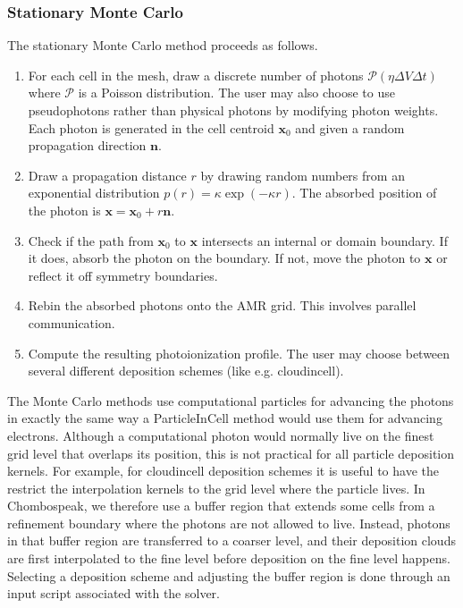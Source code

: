 \documentclass[letterpaper,10pt,english]{sphinxmanual}
\begin{document}
\subsubsection{Stationary Monte Carlo}
\label{\detokenize{Solvers/RTE:stationary-monte-carlo}}
\sphinxAtStartPar
The stationary Monte Carlo method proceeds as follows.
\begin{enumerate}
%
\item {} 
\sphinxAtStartPar
For each cell in the mesh, draw a discrete number of photons \(\mathcal{P}\left(\eta \Delta V\Delta t\right)\) where \(\mathcal{P}\) is a Poisson distribution. The user may also choose to use pseudophotons rather than physical photons by modifying photon weights. Each photon is generated in the cell centroid \(\mathbf{x}_0\) and given a random propagation direction \(\mathbf{n}\).

\item {} 
\sphinxAtStartPar
Draw a propagation distance \(r\) by drawing random numbers from an exponential distribution \(p(r) = \kappa \exp\left(-\kappa r\right)\). The absorbed position of the photon is \(\mathbf{x} = \mathbf{x}_0 + r\mathbf{n}\).

\item {} 
\sphinxAtStartPar
Check if the path from \(\mathbf{x}_0\) to \(\mathbf{x}\) intersects an internal or domain boundary. If it does, absorb the photon on the boundary. If not, move the photon to \(\mathbf{x}\) or reflect it off symmetry boundaries.

\item {} 
\sphinxAtStartPar
Rebin the absorbed photons onto the AMR grid. This involves parallel communication.

\item {} 
\sphinxAtStartPar
Compute the resulting photoionization profile. The user may choose between several different deposition schemes (like e.g. cloud\sphinxhyphen{}in\sphinxhyphen{}cell).

\end{enumerate}

\sphinxAtStartPar
The Monte Carlo methods use computational particles for advancing the photons in exactly the same way a Particle\sphinxhyphen{}In\sphinxhyphen{}Cell method would use them for advancing electrons. Although a computational photon would normally live on the finest grid level that overlaps its position, this is not practical for all particle deposition kernels. For example, for cloud\sphinxhyphen{}in\sphinxhyphen{}cell deposition schemes it is useful to have the restrict the interpolation kernels to the grid level where the particle lives. In Chombo\sphinxhyphen{}speak, we therefore use a buffer region that extends some cells from a refinement boundary where the photons are not allowed to live. Instead, photons in that buffer region are transferred to a coarser level, and their deposition clouds are first interpolated to the fine level before deposition on the fine level happens. Selecting a deposition scheme and adjusting the buffer region is done through an input script associated with the solver.
\end{document}
